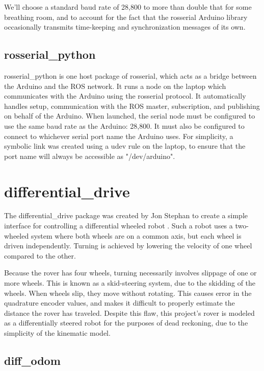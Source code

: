 We'll choose a standard baud rate of 28,800 to more than double that for some breathing room, and to account for the fact that the rosserial Arduino library occasionally transmits time-keeping and synchronization messages of its own.

\subsection{rosserial\_python}
rosserial\_python is one host package of rosserial, which acts as a bridge between the Arduino and the ROS network. It runs a node on the laptop which communicates with the Arduino using the rosserial protocol. It automatically handles setup, communication with the ROS master, subscription, and publishing on behalf of the Arduino. When launched, the serial node must be configured to use the same baud rate as the Arduino: 28,800. It must also be configured to connect to whichever serial port name the Arduino uses. For simplicity, a symbolic link was created using a udev rule on the laptop, to ensure that the port name will always be accessible as "/dev/arduino". %

\section{differential\_drive}
The differential\_drive package was created by Jon Stephan to create a simple interface for controlling a differential wheeled robot \cite{}. Such a robot uses a two-wheeled system where both wheels are on a common axis, but each wheel is driven independently. Turning is achieved by lowering the velocity of one wheel compared to the other.

Because the rover has four wheels, turning necessarily involves slippage of one or more wheels. This is known as a skid-steering system, due to the skidding of the wheels. When wheels slip, they move without rotating. This causes error in the quadrature encoder values, and makes it difficult to properly estimate the distance the rover has traveled. Despite this flaw, this project's rover is modeled as a differentially steered robot for the purposes of dead reckoning, due to the simplicity of the kinematic model. 

\subsection{diff\_odom} \label{sectionOdomPublishing}

